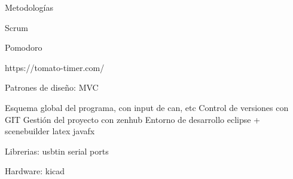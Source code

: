 
Metodologías

Scrum



Pomodoro

https://tomato-timer.com/



Patrones de diseño:
MVC

Esquema global del programa, con input de can, etc
Control de versiones con GIT
Gestión del proyecto con zenhub
Entorno de desarrollo eclipse + scenebuilder
latex
javafx

Librerias:
usbtin
serial ports

Hardware:
kicad

